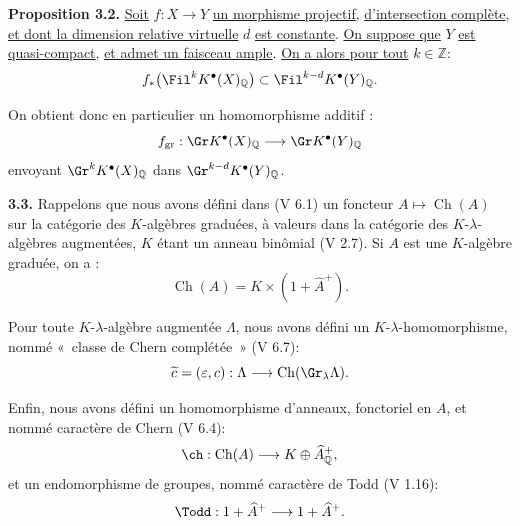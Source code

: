 
\textbf{Proposition 3.2.} \uline{Soit} $f:X\to Y$ \uline{un morphisme projectif}, \uline{d'intersection complète}, \uline{et dont la dimension relative virtuelle} $d$ \uline{est constante}. \uline{On suppose que} $Y$ \uline{est quasi-compact}, \uline{et admet un faisceau ample}. \uline{On a alors pour tout} $k\in\mathbb Z$:
\[
f_*\bigl(\Fil^kK^{\bullet}(X)_{\mathbb Q}\bigr)
\subset
\Fil^{k-d}K^{\bullet}(Y)_{\mathbb Q}.
\]

On obtient donc en particulier un homomorphisme additif :
\[
f_{\mathrm{gr}}:\Gr K^{\bullet}(X)_{\mathbb Q}\longrightarrow
\Gr K^{\bullet}(Y)_{\mathbb Q}
\]
envoyant $\Gr^kK^{\bullet}(X)_{\mathbb Q}$ dans $\Gr^{k-d}K^{\bullet}(Y)_{\mathbb Q}$.

\textbf{3.3.} Rappelons que nous avons défini dans (V 6.1) un foncteur $A\longmapsto \operatorname{Ch}(A)$ sur la catégorie des $K$-algèbres graduées, à valeurs dans la catégorie des $K$-$\lambda$-algèbres augmentées, $K$ étant un anneau binômial (V 2.7). Si $A$ est une $K$-algèbre graduée, on a :
\[
\operatorname{Ch}(A)=K\times(1+\widehat A^+).
\]

Pour toute $K$-$\lambda$-algèbre augmentée $\Lambda$, nous avons défini un $K$-$\lambda$-homomorphisme, nommé «~classe de Chern complétée~» (V 6.7):
\[
\widetilde c=(\varepsilon,c):\Lambda\longrightarrow\operatorname{Ch}(\Gr_{\lambda}\Lambda).
\]

Enfin, nous avons défini un homomorphisme d'anneaux, fonctoriel en $A$, et nommé caractère de Chern (V 6.4):
\[
\ch:\operatorname{Ch}(A)\longrightarrow K\oplus\widehat A^+_{\mathbb Q},
\]
et un endomorphisme de groupes, nommé caractère de Todd (V 1.16):
\[
\Todd:1+\widehat A^+\longrightarrow1+\widehat A^+.
\]
